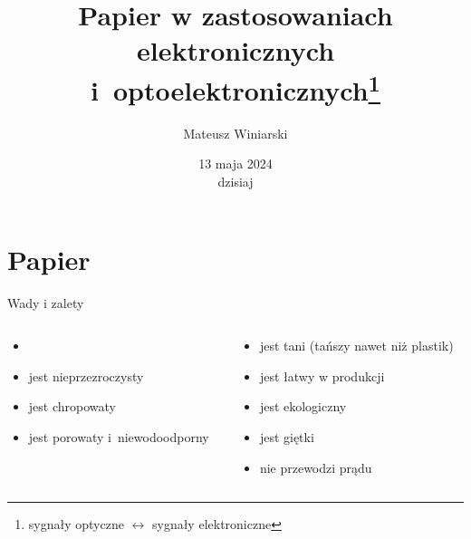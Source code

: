\documentclass{beamer}
\title[Papier w zastosowaniach elektronicznych i~optoelektronicznych$^1$]{Papier w zastosowaniach elektronicznych i~optoelektronicznych\footnote{sygnały optyczne $\leftrightarrow$ sygnały elektroniczne}}
\author[M. Winiarski]{Mateusz Winiarski}
\institute[fizyk UJ]{fizyka IV-I, WFAIS}
\date[dzisiaj]{13 maja 2024\\dzisiaj}
\begin{document}
\frame{\titlepage}

\section{Papier}
        \begin{frame}{Wady \hfill i \hfill zalety}
\begin{columns}

\begin{column}{0.5\textwidth}
    \begin{itemize}
        \item {} 
        \item jest nieprzezroczysty
        \item jest chropowaty
        \item jest porowaty i~niewodoodporny
    \end{itemize}
\end{column}\pause
\begin{column}{0.5\textwidth}
    \begin{itemize}
        \item jest tani (tańszy nawet niż plastik)
        \item jest łatwy w produkcji
        \item jest ekologiczny
        \item jest giętki
        \item nie przewodzi prądu
    \end{itemize}
    \end{column}
\end{columns}
\end{frame}
\end{document}
